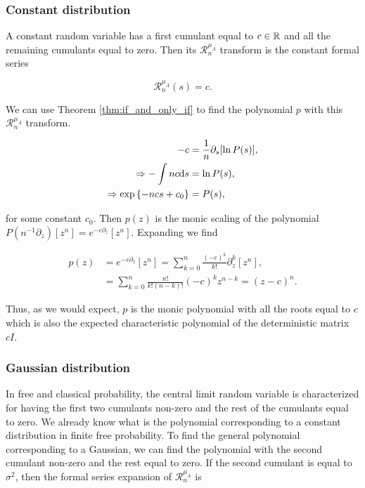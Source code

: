 \subsubsection{Constant distribution}

A constant random variable has a first cumulant equal to $c \in \mathbb R$ and all the remaining cumulants equal to zero. Then its $\mathcal R_n^{\mu_A}$ transform is the constant formal series

\begin{equation*}
    \mathcal R_n^{\mu_A}(s) = c.
\end{equation*}

We can use Theorem \ref{thm:if_and_only_if} to find the polynomial $p$ with this $\mathcal R_n^{\mu_A}$ transform.

\begin{align*}
    -c &= \frac{1}{n}\partial_s[\ln P(s)],\\
    \Rightarrow -\int nc\mathrm d s &= \ln P(s),\\
    \Rightarrow \exp\left\{-ncs + c_0\right\} &= P(s),
\end{align*}

\noindent for some constant $c_0$. Then $p(z)$ is the monic scaling of the polynomial $P(n^{-1}\partial_z)[z^n] = e^{-c\partial_z}[z^n]$. Expanding we find

\begin{align*}
    p(z) &= e^{-c\partial_z}[z^n] = \sum_{k=0}^n \frac{(-c)^k}{k!}\partial_z^k[z^n],\\
    &= \sum_{k=0}^n \frac{n!}{k!(n-k)!}(-c)^k z^{n-k} = (z-c)^n.
\end{align*}

Thus, as we would expect, $p$ is the monic polynomial with all the roots equal to $c$ which is also the expected characteristic polynomial of the deterministic matrix $cI$.

\subsubsection{Gaussian distribution}

In free and classical probability, the central limit random variable is characterized for having the first two cumulants non-zero and the rest of the cumulants equal to zero. We already know what is the polynomial corresponding to a constant distribution in finite free probability. To find the general polynomial corresponding to a Gaussian, we can find the polynomial with the second cumulant non-zero and the rest equal to zero. If the second cumulant is equal to $\sigma^2$, then the formal series expansion of $\mathcal R_n^{\mu_A}$ is

